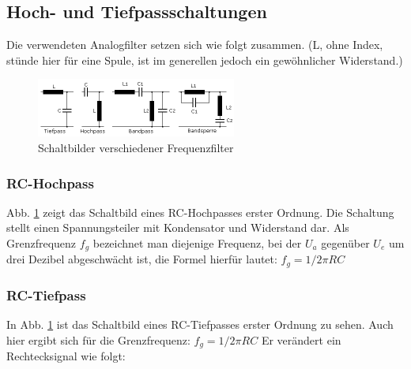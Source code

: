 \subsection{Hoch- und Tiefpassschaltungen}
Die verwendeten Analogfilter setzen sich wie folgt zusammen.
(L, ohne Index, stünde hier für eine Spule, ist im generellen jedoch ein gewöhnlicher Widerstand.)
\begin{figure}[H]
    \centering
    \includegraphics[width=\textwidth]{Abb/pass.pdf} 
    \caption{Schaltbilder verschiedener Frequenzfilter}
    \label{pass}
\end{figure}

\subsubsection{RC-Hochpass}
Abb. \ref{pass} zeigt das Schaltbild eines RC-Hochpasses erster Ordnung. Die Schaltung stellt einen Spannungsteiler mit Kondensator und Widerstand dar.
Als Grenzfrequenz $f_g$ bezeichnet man diejenige Frequenz, bei der $U_a$ gegenüber $U_e$ um drei Dezibel abgeschwächt ist, die Formel hierfür lautet: $f_g=1/2\pi R C$

\subsubsection{RC-Tiefpass}

In Abb. \ref{pass} ist das Schaltbild eines RC-Tiefpasses erster Ordnung zu sehen. Auch hier ergibt sich für die Grenzfrequenz: $f_g=1/2 \pi RC$
Er verändert ein Rechtecksignal wie folgt:

